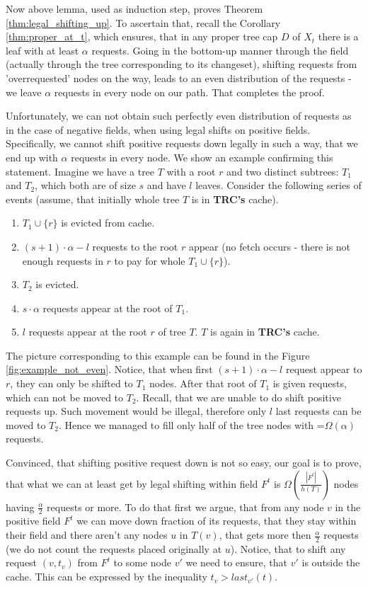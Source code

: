 Now above lemma, used as induction step, proves Theorem
\ref{thm:legal_shifting_up}. To ascertain that, recall the Corollary
\ref{thm:proper_at_t}, which ensures, that in any proper tree cap $D$ of $X_t$
there is a leaf with at least $\alpha$ requests. Going in the bottom-up manner
through the field (actually through the tree corresponding to its changeset), shifting requests from 'overrequested' nodes on the way,
leads to an even distribution of the requests - we leave $\alpha$ requests in
every node on our path. That completes the proof.


Unfortunately, we can not obtain such perfectly even distribution of requests as in the case of negative fields,
when using legal shifts on positive fields.
Specifically, we cannot shift positive requests down legally in such a way, that
we end up with $\alpha$ requests in every node. We show an example confirming
this statement. Imagine we have a tree $T$ with a root $r$ and two distinct
subtrees: $T_1$ and $T_2$, which both are of size $s$ and have $l$ leaves.
Consider the following series of events (assume, that initially whole tree $T$
is in \textbf{TRC's} cache).  \begin{enumerate} \item $T_1 \cup \{r\}$ is
evicted from cache.  \item $(s+1) \cdot \alpha - l$ requests to the root $r$
appear (no fetch occurs - there is not enough requests in $r$ to pay for whole
$T_1 \cup \{r\}$).  \item $T_2$ is evicted.  \item $s \cdot \alpha$ requests
appear at the root of $T_1$.  \item $l$ requests appear at the root $r$ of tree
$T$. $T$ is again in \textbf{TRC's} cache.  \end{enumerate}

The picture corresponding to this example can be found in the Figure
\ref{fig:example_not_even}. 
Notice, that when first $(s+1) \cdot \alpha - l$
request appear to $r$, they can only be shifted to $T_1$ nodes. After that root
of $T_1$ is given requests, which can not be moved to $T_2$. Recall, that we are
unable to do shift positive requests up. Such movement would be illegal,
therefore only $l$ last requests can be moved to $T_2$. Hence we managed to fill
only half of the tree nodes with =$\Omega(\alpha)$ requests.   

Convinced, that shifting positive request down is not so easy, our goal is to
prove, that what we can at least get by legal shifting within field $F^t$ is
$\Omega(\frac{|F^t|}{h(T)})$ nodes having $\frac{\alpha}{2}$ requests or more.
To do that first we argue, that from any node $v$ in the positive field $F^t$ we
can move down fraction of its requests, that they stay within their field and there
aren't any nodes $u$ in $T(v)$, that gets more then $\frac{\alpha}{2}$ requests
(we do not count the requests placed originally at $u$). Notice, that to shift
any request $(v, t_v)$ from $F^t$ to some node $v'$ we need to ensure, that $v'$
is outside the cache. This can be expressed by the inequality $t_v > last_{v'}(t)$.

